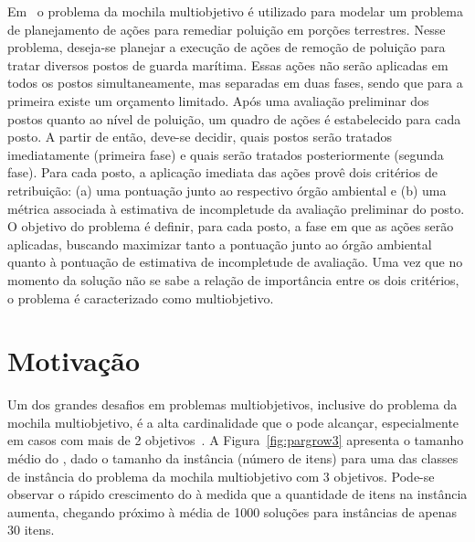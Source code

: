 Em~\cite{jenkins2002bicriteria} o problema da mochila multiobjetivo é
utilizado para modelar um problema de planejamento de ações para remediar
poluição em porções terrestres.
Nesse problema, deseja-se planejar a execução de ações de remoção de poluição
para tratar diversos postos de guarda marítima.
Essas ações não serão aplicadas em todos os postos simultaneamente,
mas separadas em duas fases, sendo que
para a primeira existe um orçamento limitado.
Após uma avaliação preliminar dos postos quanto ao nível de poluição,
um quadro de ações é estabelecido para cada posto.
A partir de então, deve-se decidir, quais postos serão tratados
imediatamente (primeira fase) e quais serão tratados posteriormente (segunda fase).
Para cada posto, a aplicação imediata das ações provê dois critérios de retribuição:
(a) uma pontuação junto ao respectivo órgão ambiental e
(b) uma métrica associada à estimativa de incompletude da avaliação preliminar do posto.
O objetivo do problema é definir, para cada posto, a fase em que as ações serão
aplicadas, buscando maximizar tanto a pontuação junto ao órgão ambiental quanto à
pontuação de estimativa de incompletude de avaliação.
Uma vez que no momento da solução não se sabe a relação de importância entre os dois critérios,
o problema é caracterizado como multiobjetivo.


\section{Motivação}

Um dos grandes desafios em problemas multiobjetivos, inclusive do problema
da mochila multiobjetivo, é a alta cardinalidade que o
\paretoset{} pode alcançar, especialmente em casos com mais de 2 objetivos~\cite{ehrgott2013multicriteria}.
A Figura~\ref{fig:pargrow3} apresenta o tamanho médio do \paretoset{}, dado o tamanho da instância (número de itens)
para uma das classes de instância do problema da mochila multiobjetivo com 3 objetivos.
Pode-se observar o rápido crescimento do \paretoset{} à medida que a quantidade de itens na instância aumenta,
chegando próximo à média de 1000 soluções para instâncias de apenas $30$ itens.

